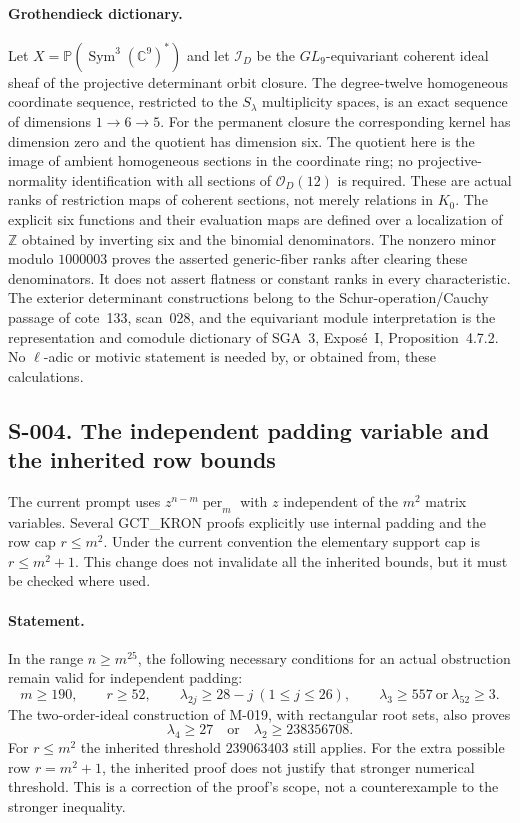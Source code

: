 \paragraph{Grothendieck dictionary.}
Let $X=\mathbb P(\operatorname{Sym}^3(\mathbb C^9)^*)$ and let
$\mathcal I_D$ be the $GL_9$-equivariant coherent ideal sheaf of the
projective determinant orbit closure. The degree-twelve homogeneous
coordinate sequence, restricted to the $S_\lambda$ multiplicity spaces,
is an exact sequence of dimensions $1\to6\to5$. For the permanent
closure the corresponding kernel has dimension zero and the quotient
has dimension six. The quotient here is the image of ambient homogeneous
sections in the coordinate ring; no projective-normality identification
with all sections of $\mathcal O_D(12)$ is required. These are actual ranks of restriction maps of
coherent sections, not merely relations in $K_0$. The explicit six
functions and their evaluation maps are defined over a localization of
$\mathbb Z$ obtained by inverting six and the binomial denominators.
The nonzero minor modulo $1000003$ proves the asserted generic-fiber
ranks after clearing these denominators. It does not assert flatness or
constant ranks in every characteristic. The exterior determinant
constructions belong to the Schur-operation/Cauchy passage of cote~133,
scan~028, and the equivariant module interpretation is the representation
and comodule dictionary of SGA~3, Expos\'e~I, Proposition~4.7.2. No
$\ell$-adic or motivic statement is needed by, or obtained from, these
calculations.

\subsection{S-004. The independent padding variable and the inherited row bounds}
The current prompt uses $z^{n-m}\operatorname{per}_m$ with $z$ independent
of the $m^2$ matrix variables. Several GCT\_KRON proofs explicitly use
internal padding and the row cap $r\leq m^2$. Under the current convention
the elementary support cap is $r\leq m^2+1$. This change does not
invalidate all the inherited bounds, but it must be checked where used.

\paragraph{Statement.}
In the range $n\geq m^{25}$, the following necessary conditions for an
actual obstruction remain valid for independent padding:
\[
 m\geq190,\qquad r\geq52,\qquad
 \lambda_{2j}\geq28-j\ (1\leq j\leq26),\qquad
 \lambda_3\geq557\ \text{or}\ \lambda_{52}\geq3.
\]
The two-order-ideal construction of M-019, with rectangular root sets,
also proves
\[
              \lambda_4\geq27\quad\text{or}\quad
              \lambda_2\geq238356708.
\]
For $r\leq m^2$ the inherited threshold $239063403$ still applies.
For the extra possible row $r=m^2+1$, the inherited proof does not justify
that stronger numerical threshold. This is a correction of the proof's
scope, not a counterexample to the stronger inequality.

